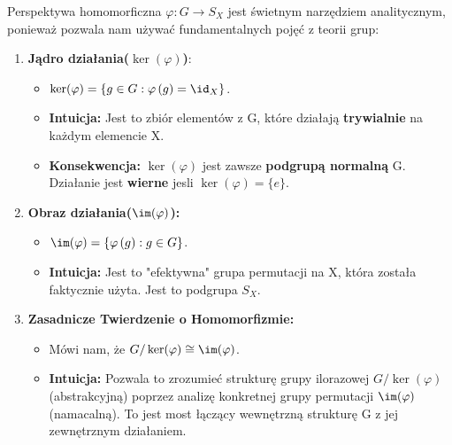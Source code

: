 \begin{intuition}
	Perspektywa homomorficzna $\varphi: G\rightarrow S_{X}$ jest świetnym narzędziem analitycznym, ponieważ pozwala nam używać fundamentalnych pojęć z teorii grup:
	\begin{enumerate}[label=\Roman*.]
		\item \textbf{Jądro działania($\ker(\varphi) $)}:
			\begin{itemize}
				\item $\ker(\varphi) = \{g \in G: \varphi\left( g \right) = \id_{X}\} $.
				\item \textbf{Intuicja:} Jest to zbiór elementów z G, które działają \textbf{trywialnie} na każdym elemencie X.
				\item \textbf{Konsekwencja:} $\ker(\varphi) $ jest zawsze  \textbf{podgrupą normalną} G. Działanie jest \textbf{wierne} jesli $\ker(\varphi) = \{e\} $.
			\end{itemize}
		\item \textbf{Obraz działania($\im(\varphi)$):}
			\begin{itemize}
				\item $\im(\varphi) = \{\varphi\left( g \right) : g\in G\} $.
				\item \textbf{Intuicja: } Jest to "efektywna" grupa permutacji na X, która została faktycznie użyta. Jest to podgrupa $S_{X}$.
			\end{itemize}
		\item \textbf{Zasadnicze Twierdzenie o Homomorfizmie: }
			\begin{itemize}
				\item Mówi nam, że $G/\ker(\varphi) \cong \im(\varphi)  $.
				\item \textbf{Intuicja: } Pozwala to zrozumieć strukturę grupy ilorazowej $G / \ker(\varphi) $ (abstrakcyjną) poprzez analizę konkretnej grupy permutacji $\im(\varphi) $ (namacalną). To jest most łączący wewnętrzną strukturę G z jej zewnętrznym działaniem.
			\end{itemize}
	\end{enumerate}
\end{intuition}


